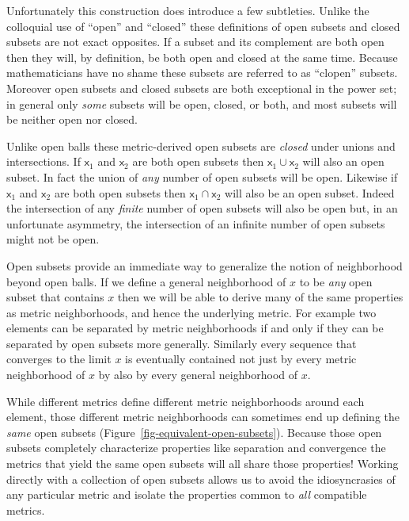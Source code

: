 \documentclass[
  letterpaper,
  DIV=11,
  numbers=noendperiod]{scrartcl}
\begin{document}
Unfortunately this construction does introduce a few subtleties. Unlike
the colloquial use of ``open'' and ``closed'' these definitions of open
subsets and closed subsets are not exact opposites. If a subset and its
complement are both open then they will, by definition, be both open and
closed at the same time. Because mathematicians have no shame these
subsets are referred to as ``clopen'' subsets. Moreover open subsets and
closed subsets are both exceptional in the power set; in general only
\emph{some} subsets will be open, closed, or both, and most subsets will
be neither open nor closed.

Unlike open balls these metric-derived open subsets are \emph{closed}
under unions and intersections. If \(\mathsf{x}_{1}\) and
\(\mathsf{x}_{2}\) are both open subsets then
\(\mathsf{x}_{1} \cup \mathsf{x}_{2}\) will also an open subset. In fact
the union of \emph{any} number of open subsets will be open. Likewise if
\(\mathsf{x}_{1}\) and \(\mathsf{x}_{2}\) are both open subsets then
\(\mathsf{x}_{1} \cap \mathsf{x}_{2}\) will also be an open subset.
Indeed the intersection of any \emph{finite} number of open subsets will
also be open but, in an unfortunate asymmetry, the intersection of an
infinite number of open subsets might not be open.

Open subsets provide an immediate way to generalize the notion of
neighborhood beyond open balls. If we define a general neighborhood of
\(x\) to be \emph{any} open subset that contains \(x\) then we will be
able to derive many of the same properties as metric neighborhoods, and
hence the underlying metric. For example two elements can be separated
by metric neighborhoods if and only if they can be separated by open
subsets more generally. Similarly every sequence that converges to the
limit \(x\) is eventually contained not just by every metric
neighborhood of \(x\) by also by every general neighborhood of \(x\).

While different metrics define different metric neighborhoods around
each element, those different metric neighborhoods can sometimes end up
defining the \emph{same} open subsets
(Figure~\ref{fig-equivalent-open-subsets}). Because those open subsets
completely characterize properties like separation and convergence the
metrics that yield the same open subsets will all share those
properties! Working directly with a collection of open subsets allows us
to avoid the idiosyncrasies of any particular metric and isolate the
properties common to \emph{all} compatible metrics.
\end{document}
